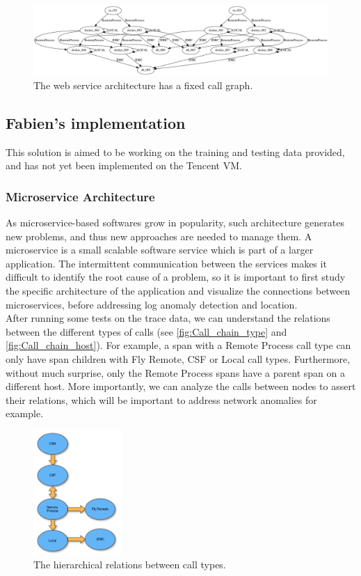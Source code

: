 \documentclass[acmsmall, screen, nonacm]{acmart}
\begin{document}
\begin{figure}[h!]
  \centering
  \includegraphics[width=\textwidth]{images/call_graph.png}
  \caption{The web service architecture has a fixed call graph.}
  \label{fig:call_graph}
\end{figure}

\subsection{Fabien's implementation}
This solution is aimed to be working on the training and testing data provided, and has not yet been implemented on the Tencent VM.
\\
\subsubsection*{Microservice Architecture}
As microservice-based softwares grow in popularity, such architecture generates new problems, and thus new approaches are needed to manage them. A microservice is a small scalable software service which is part of a larger application. The intermittent communication between the services makes it difficult to identify the root cause of a problem, so it is important to first study the specific architecture of the application and visualize the connections between microservices, before addressing log anomaly detection and location.
\\
After running some tests on the trace data, we can understand the relations between the different types of calls (see \autoref{fig:Call_chain_type} and \autoref{fig:Call_chain_host}). For example, a span with a Remote Process call type can only have span children with Fly Remote, CSF or Local call types. Furthermore, without much surprise, only the Remote Process spans have a parent span on a different host.
More importantly, we can analyze the calls between nodes to assert their relations, which will be important to address network anomalies for example.

\begin{figure}[h!]
  \centering
  \includegraphics[width=0.3\textwidth]{images/Call_chain_type.png}
  \caption{The hierarchical relations between call types.}
  \label{fig:Call_chain_type}
\end{figure}
\end{document}
